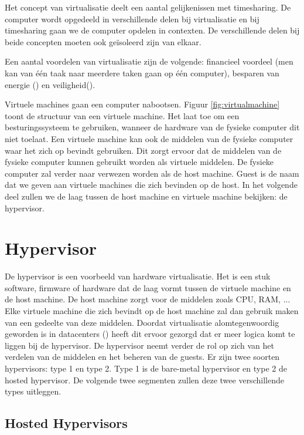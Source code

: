 \documentclass[pdftex,a4paper,12pt,twoside]{report}
\begin{document}
Het concept van virtualisatie deelt een aantal gelijkenissen met timesharing. De computer wordt opgedeeld in verschillende delen bij virtualisatie en bij timesharing gaan we de computer opdelen in contexten. De verschillende delen bij beide concepten moeten ook geïsoleerd zijn van elkaar.

Een aantal voordelen van virtualisatie zijn de volgende: financieel voordeel (men kan van één taak naar meerdere taken gaan op één computer), besparen van energie (\cite{beloglazov_energy_2010}) en veiligheid(\cite{mortleman_security_2009}).

Virtuele machines gaan een computer nabootsen. Figuur \ref{fig:virtualmachine} toont de structuur van een virtuele machine. Het laat toe om een besturingssysteem te gebruiken, wanneer de hardware van de fysieke computer dit niet toelaat. Een virtuele machine kan ook de middelen van de fysieke computer waar het zich op bevindt gebruiken. Dit zorgt ervoor dat de middelen van de fysieke computer kunnen gebruikt worden als virtuele middelen. De fysieke computer zal verder naar verwezen worden als de host machine. Guest is de naam dat we geven aan virtuele machines die zich bevinden op de host. In het volgende deel zullen we de laag tussen de host machine en virtuele machine bekijken: de hypervisor. 

\section{Hypervisor}

De hypervisor is een voorbeeld van hardware virtualisatie. Het is een stuk software, firmware of hardware dat de laag vormt tussen de virtuele machine en de host machine. De host machine zorgt voor de middelen zoals CPU, RAM, ... Elke virtuele machine die zich bevindt op de host machine zal dan gebruik maken van een gedeelte van deze middelen. Doordat virtualisatie alomtegenwoordig geworden is in datacenters (\cite{soundararajan_impact_2010}) heeft dit ervoor gezorgd dat er meer logica komt te liggen bij de hypervisor. De hypervisor neemt verder de rol op zich van het verdelen van de middelen en het beheren van de guests. Er zijn twee soorten hypervisors: type 1 en type 2. Type 1 is de bare-metal hypervisor en type 2 de hosted hypervisor. De volgende twee segmenten zullen deze twee verschillende types uitleggen.

\newpage

\subsection{Hosted Hypervisors}
\end{document}
